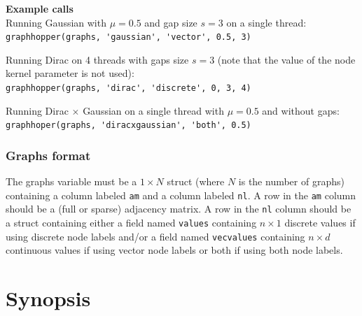 \documentclass{article}
\begin{document}
\begin{appendices}
\textbf{Example calls}\\
Running Gaussian with $\mu=0.5$ and gap size $s=3$ on a single thread:\\
\verb|graphhopper(graphs, 'gaussian', 'vector', 0.5, 3)|

Running Dirac on 4 threads with gaps size $s=3$ (note that the value of the node kernel parameter is not used):\\
\verb|graphhopper(graphs, 'dirac', 'discrete', 0, 3, 4)|

Running Dirac $\times$ Gaussian on a single thread with $\mu=0.5$ and without gaps:\\
\verb|graphhoper(graphs, 'diracxgaussian', 'both', 0.5)|


\subsubsection{Graphs format}
\label{appendix:graphs-format}
The graphs variable must be a $1\times N$ struct (where $N$ is the number of graphs) containing a column labeled \verb|am| and a column labeled \verb|nl|. A row in the \verb|am| column should be a (full or sparse) adjacency matrix. A row in the \verb|nl| column should be a struct containing either a field named \verb|values| containing $n\times 1$ discrete values if using discrete node labels and/or a field named \verb|vecvalues| containing $n\times d$ continuous values if using vector node labels or both if using both node labels.

\section{Synopsis}


\end{appendices}
\end{document}
